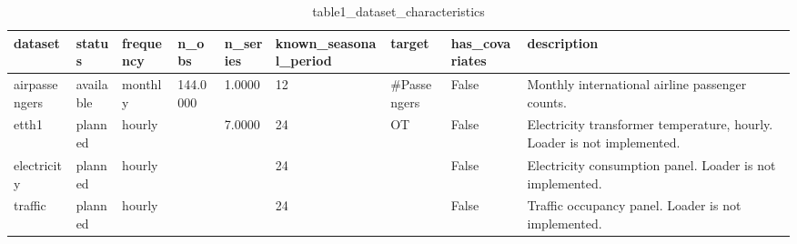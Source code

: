 \begin{table}[t]
\centering
\begin{tabular}{lllllllll}
\hline
dataset & status & frequency & n\_obs & n\_series & known\_seasonal\_period & target & has\_covariates & description \\
\hline
airpassengers & available & monthly & 144.0000 & 1.0000 & 12 & #Passengers & False & Monthly international airline passenger counts. \\
etth1 & planned & hourly &  & 7.0000 & 24 & OT & False & Electricity transformer temperature, hourly. Loader is not implemented. \\
electricity & planned & hourly &  &  & 24 &  & False & Electricity consumption panel. Loader is not implemented. \\
traffic & planned & hourly &  &  & 24 &  & False & Traffic occupancy panel. Loader is not implemented. \\
\hline
\end{tabular}
\caption{table1\_dataset\_characteristics}
\end{table}
